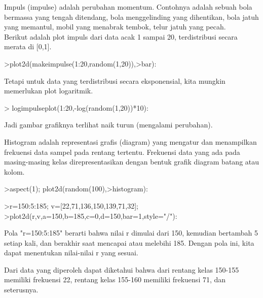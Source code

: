 \documentclass[a4paper,10pt]{article}
\begin{document}
\begin{eulernotebook}
\begin{eulercomment}
\begin{eulercomment}
\begin{eulercomment}
\begin{eulercomment}
\begin{eulercomment}
\begin{eulercomment}
\begin{eulercomment}
\begin{eulercomment}
\begin{eulercomment}
\begin{eulercomment}
\begin{eulercomment}
\begin{eulercomment}
\begin{eulercomment}
\end{eulercomment}
\begin{eulercomment}
Impuls (impulse) adalah perubahan momentum. Contohnya adalah sebuah
bola bermassa yang tengah ditendang, bola menggelinding yang
dihentikan, bola jatuh yang memantul, mobil yang menabrak tembok,
telur jatuh yang pecah.\\
Berikut adalah plot impuls dari data acak 1 sampai 20, terdistribusi
secara merata di [0,1].
\end{eulercomment}
\begin{eulerprompt}
>plot2d(makeimpulse(1:20,random(1,20)),>bar):
\end{eulerprompt}
\begin{eulercomment}
Tetapi untuk data yang terdistribusi secara eksponensial, kita mungkin
memerlukan plot logaritmik.
\end{eulercomment}
\begin{eulerprompt}
> logimpulseplot(1:20,-log(random(1,20))*10):
\end{eulerprompt}
\begin{eulercomment}
Jadi gambar grafiknya terlihat naik turun (mengalami perubahan).
\end{eulercomment}
\begin{eulercomment}
Histogram adalah representasi grafis (diagram) yang mengatur dan
menampilkan frekuensi data sampel pada rentang tertentu. Frekuensi
data yang ada pada masing-masing kelas direpresentasikan dengan bentuk
grafik diagram batang atau kolom.
\end{eulercomment}
\begin{eulerprompt}
>aspect(1); plot2d(random(100),>histogram):
\end{eulerprompt}
\begin{eulerprompt}
>r=150:5:185; v=[22,71,136,150,139,71,32];
>plot2d(r,v,a=150,b=185,c=0,d=150,bar=1,style="/"):
\end{eulerprompt}
\begin{eulercomment}
Pola "r=150:5:185" berarti bahwa nilai r dimulai dari 150, kemudian
bertambah 5 setiap kali, dan berakhir saat mencapai atau melebihi 185.
Dengan pola ini, kita dapat menentukan nilai-nilai r yang sesuai.

Dari data yang diperoleh dapat diketahui bahwa dari rentang kelas
150-155 memiliki frekuensi 22, rentang kelas 155-160 memiliki
frekuensi 71,  dan seterusnya.


\end{eulercomment}
\end{eulercomment}
\end{eulercomment}
\end{eulercomment}
\end{eulercomment}
\end{eulercomment}
\end{eulercomment}
\end{eulercomment}
\end{eulercomment}
\end{eulercomment}
\end{eulercomment}
\end{eulercomment}
\end{eulercomment}
\end{eulernotebook}
\end{document}

